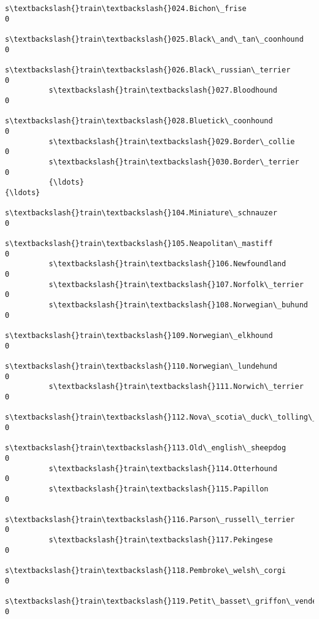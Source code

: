 \documentclass[11pt]{article}
\begin{document}
\begin{Verbatim}[commandchars=\\\{\}]
          s\textbackslash{}train\textbackslash{}024.Bichon\_frise                                         0   
          s\textbackslash{}train\textbackslash{}025.Black\_and\_tan\_coonhound                              0   
          s\textbackslash{}train\textbackslash{}026.Black\_russian\_terrier                                0   
          s\textbackslash{}train\textbackslash{}027.Bloodhound                                           0   
          s\textbackslash{}train\textbackslash{}028.Bluetick\_coonhound                                   0   
          s\textbackslash{}train\textbackslash{}029.Border\_collie                                        0   
          s\textbackslash{}train\textbackslash{}030.Border\_terrier                                       0   
          {\ldots}                                                            {\ldots}   
          s\textbackslash{}train\textbackslash{}104.Miniature\_schnauzer                                  0   
          s\textbackslash{}train\textbackslash{}105.Neapolitan\_mastiff                                   0   
          s\textbackslash{}train\textbackslash{}106.Newfoundland                                         0   
          s\textbackslash{}train\textbackslash{}107.Norfolk\_terrier                                      0   
          s\textbackslash{}train\textbackslash{}108.Norwegian\_buhund                                     0   
          s\textbackslash{}train\textbackslash{}109.Norwegian\_elkhound                                   0   
          s\textbackslash{}train\textbackslash{}110.Norwegian\_lundehund                                  0   
          s\textbackslash{}train\textbackslash{}111.Norwich\_terrier                                      0   
          s\textbackslash{}train\textbackslash{}112.Nova\_scotia\_duck\_tolling\_retriever                   0   
          s\textbackslash{}train\textbackslash{}113.Old\_english\_sheepdog                                 0   
          s\textbackslash{}train\textbackslash{}114.Otterhound                                           0   
          s\textbackslash{}train\textbackslash{}115.Papillon                                             0   
          s\textbackslash{}train\textbackslash{}116.Parson\_russell\_terrier                               0   
          s\textbackslash{}train\textbackslash{}117.Pekingese                                            0   
          s\textbackslash{}train\textbackslash{}118.Pembroke\_welsh\_corgi                                 0   
          s\textbackslash{}train\textbackslash{}119.Petit\_basset\_griffon\_vendeen                         0   

\end{Verbatim}
\end{document}

